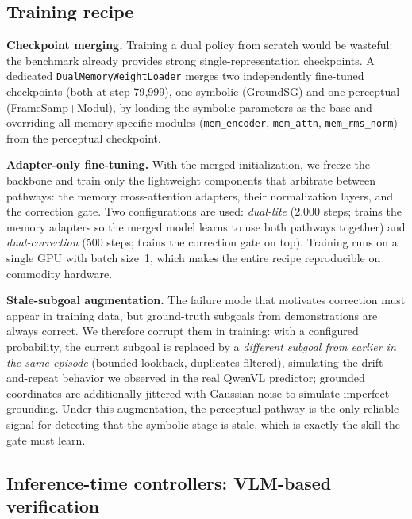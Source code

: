 \documentclass{article}
\begin{document}
\subsection{Training recipe}
\label{sec:method-training}

\textbf{Checkpoint merging.} Training a dual policy from scratch would be wasteful: the benchmark already provides strong single-representation checkpoints. A dedicated \texttt{DualMemoryWeightLoader} merges two independently fine-tuned checkpoints (both at step 79{,}999), one symbolic (GroundSG) and one perceptual (FrameSamp+Modul), by loading the symbolic parameters as the base and overriding all memory-specific modules (\texttt{mem\_encoder}, \texttt{mem\_attn}, \texttt{mem\_rms\_norm}) from the perceptual checkpoint.

\textbf{Adapter-only fine-tuning.} With the merged initialization, we freeze the backbone and train only the lightweight components that arbitrate between pathways: the memory cross-attention adapters, their normalization layers, and the correction gate. Two configurations are used: \emph{dual-lite} (2{,}000 steps; trains the memory adapters so the merged model learns to use both pathways together) and \emph{dual-correction} (500 steps; trains the correction gate on top). Training runs on a single GPU with batch size~1, which makes the entire recipe reproducible on commodity hardware.

\textbf{Stale-subgoal augmentation.} The failure mode that motivates correction must appear in training data, but ground-truth subgoals from demonstrations are always correct. We therefore corrupt them in training: with a configured probability, the current subgoal is replaced by a \emph{different subgoal from earlier in the same episode} (bounded lookback, duplicates filtered), simulating the drift-and-repeat behavior we observed in the real QwenVL predictor; grounded coordinates are additionally jittered with Gaussian noise to simulate imperfect grounding. Under this augmentation, the perceptual pathway is the only reliable signal for detecting that the symbolic stage is stale, which is exactly the skill the gate must learn.

\subsection{Inference-time controllers: VLM-based verification}
\label{sec:method-controllers}
\end{document}
